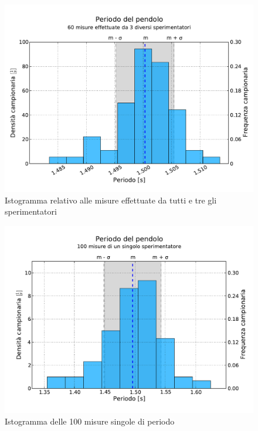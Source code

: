 \begin{figure}[][p]
	\centering
	\includegraphics[width=120mm]{grafici/Pendolo.pdf}
	\caption{Istogramma relativo alle misure effettuate da tutti e tre gli sperimentatori}
    \label{fig:pendolo}
\end{figure}

\begin{figure}[][p]
	\centering
	\includegraphics[width=120mm]{grafici/Pendolo100.pdf}
	\caption{Istogramma delle 100 misure singole di periodo}
    \label{fig:pendolo100}
\end{figure}

